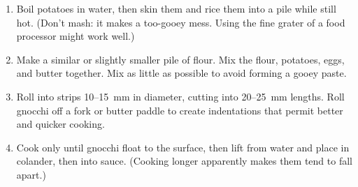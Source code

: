 
\begin{ingredients}
\end{ingredients}


\begin{recipe}
  \begin{enumerate}

  \item Boil potatoes in water, then skin them and rice them into a
    pile while still hot.  (Don't mash: it makes a too-gooey mess.
    Using the fine grater of a food processor might work well.)

  \item Make a similar or slightly smaller pile of flour.  Mix the
    flour, potatoes, eggs, and butter together.  Mix as little as
    possible to avoid forming a gooey paste.

  \item Roll into strips 10--15~mm in diameter, cutting into 20--25~mm
    lengths.  Roll gnocchi off a fork or butter paddle to create
    indentations that permit better and quicker cooking.

  \item Cook only until gnocchi float to the surface, then lift from
    water and place in colander, then into sauce.  (Cooking longer
    apparently makes them tend to fall apart.)

  \end{enumerate}
\end{recipe}
